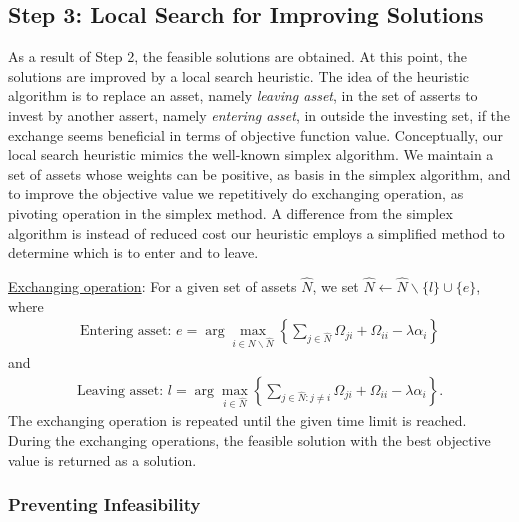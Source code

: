 \documentclass[11pt]{article}
\begin{document}
	
	
\subsection{Step 3: Local Search for Improving Solutions}

As a result of Step 2, the feasible solutions are obtained. At this point, the solutions are improved by a local search heuristic. The idea of the heuristic algorithm is to replace an asset, namely \emph{leaving asset}, in the set of asserts to invest by another assert, namely \emph{entering asset}, in outside the investing set, if the exchange seems beneficial in terms of objective function value. Conceptually, our local search heuristic mimics the well-known simplex algorithm. We maintain a set of assets whose weights can be positive, as basis in the simplex algorithm, and to improve the objective value we repetitively do exchanging operation, as pivoting operation in the simplex method. A difference from the simplex algorithm is instead of reduced cost our heuristic employs a simplified method to determine which is to enter and to leave. 

\underline{Exchanging operation}: For a given set of assets $\hat{N}$, we set $\hat{N} \gets \hat{N} \backslash \{l\} \cup \{e\}$, where
\begin{align}
\text{Entering asset: } e = \arg\max_{i \in N \backslash \hat{N}} \left\{ \sum_{j \in \hat{N}} \Omega_{ji} + \Omega_{ii} - \lambda \alpha_i \right\} \label{eq:entering}
\end{align}
and
\begin{align}
\text{Leaving asset: } l = \arg\max_{i \in \hat{N}} \left\{ \sum_{j \in \hat{N} : j \neq i} \Omega_{ji} + \Omega_{ii} - \lambda \alpha_i \right\}. \label{eq:leaving}
\end{align}
The exchanging operation is repeated until the given time limit is reached. During the exchanging operations, the feasible solution with the best objective value is returned as a solution. 

\subsubsection{Preventing Infeasibility}
\end{document}
